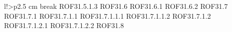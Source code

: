 \begin{tabella}{l!{\VRule}>{\centering\arraybackslash}p{2.5 cm}}
break ROF31.5.1.3 \linebreak ROF31.6 \linebreak ROF31.6.1 \linebreak ROF31.6.2 \linebreak ROF31.7 \linebreak ROF31.7.1 \linebreak ROF31.7.1.1 \linebreak ROF31.7.1.1.1 \linebreak ROF31.7.1.1.2 \linebreak ROF31.7.1.2 \linebreak ROF31.7.1.2.1 \linebreak ROF31.7.1.2.2 \linebreak ROF31.8 \linebr
\end{tabella}
